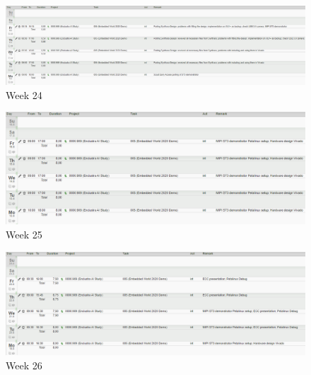 \begin{figure}[!htb]
	\centering
		\includegraphics[width=\textwidth]{timetable/week24.png}
		\caption{Week 24}
\end{figure}

\begin{figure}[!htb]
	\centering
		\includegraphics[width=\textwidth]{timetable/week25.png}
		\caption{Week 25}
\end{figure}

\begin{figure}[!htb]
	\centering
		\includegraphics[width=\textwidth]{timetable/week26.png}
		\caption{Week 26}
\end{figure}